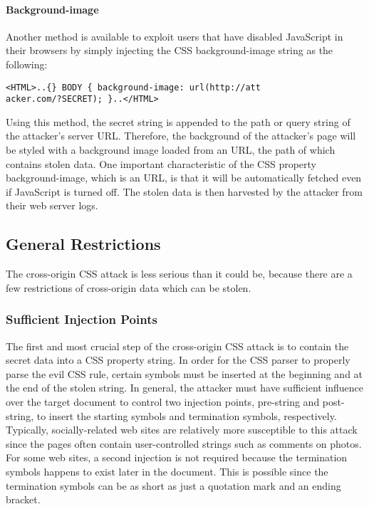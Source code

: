 \documentclass{acm_proc_article-sp}
\begin{document}
{\paragraph{Background-image}
Another method is available to exploit users that have disabled JavaScript in their browsers by simply injecting the CSS background-image string as the following:
\begin{verbatim}
<HTML>..{} BODY { background-image: url(http://att
acker.com/?SECRET); }..</HTML>
\end{verbatim}
Using this method, the secret string is appended to the path or query string of the attacker's server URL. Therefore, the background of the attacker's page will be styled with a background image loaded from an URL, the path of which contains stolen data. One important characteristic of the CSS property background-image, which is an URL, is that it will be automatically fetched even if JavaScript is turned off. The stolen data is then harvested by the attacker from their web server logs.

\subsection{General Restrictions}
The cross-origin CSS attack is less serious than it could be, because there are a few restrictions of cross-origin data which can be stolen.

\subsubsection{Sufficient Injection Points}
The first and most crucial step of the cross-origin CSS attack is to contain the secret data into a CSS property string. In order for the CSS parser to properly parse the evil CSS rule, certain symbols must be inserted at the beginning and at the end of the stolen string. In general, the attacker must have sufficient influence over the target document to control two injection points, pre-string and post-string, to insert the starting symbols and termination symbols, respectively. Typically, socially-related web sites are relatively more susceptible to this attack since the pages often contain user-controlled strings such as comments on photos. For some web sites, a second injection is not required because the termination symbols happens to exist later in the document. This is possible since the termination symbols can be as short as just a quotation mark and an ending bracket. 

}
\end{document}
